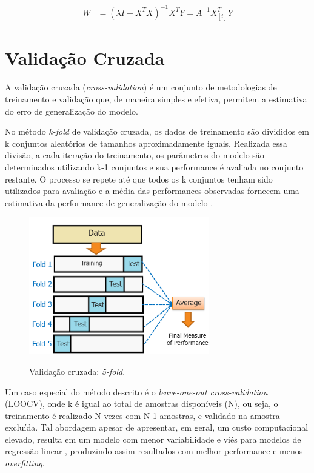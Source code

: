 \begin{equation}\begin{split}
    W &= (\lambda I + X^TX)^{-1}X^TY = A^{-1}X_{[i]}^TY
    \label{eq:lsnormal_reg}
\end{split}\end{equation}


\section{Validação Cruzada}

A validação cruzada (\textit{cross-validation}) é um conjunto de metodologias de treinamento e validação que, de maneira simples e efetiva, permitem a estimativa do erro de generalização do modelo.

No método \textit{k-fold} de validação cruzada, os dados de treinamento são divididos em k conjuntos aleatórios de tamanhos aproximadamente iguais. Realizada essa divisão, a cada iteração do treinamento, os parâmetros do modelo são determinados utilizando k-1 conjuntos e sua performance é avaliada no conjunto restante. O processo se repete até que todos os k conjuntos tenham sido utilizados para avaliação e a média das performances observadas fornecem uma estimativa da performance de generalização do modelo \cite{overfitting_crossval}.

\begin{figure}[H]
    \centering
    \caption{Validação cruzada: \textit{5-fold}.}
    \includegraphics[width=0.7\textwidth]{imgs/rev/cross_validation}
    \label{fig:dim_perf}
\end{figure}

Um caso especial do método descrito é o \textit{leave-one-out cross-validation} (LOOCV), onde k é igual ao total de 
amostras disponíveis (N), ou seja, o treinamento é realizado N vezes com N-1 amostras, e validado na amostra excluída.
 Tal abordagem apesar de apresentar, em geral, um custo computacional elevado, resulta em um modelo com menor 
 variabilidade e viés para modelos de regressão linear \cite{burman}, produzindo assim resultados com melhor 
 performance e menos \textit{overfitting}.

